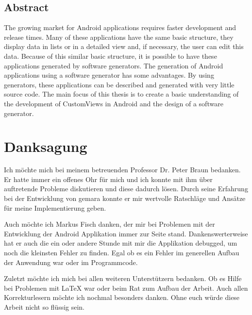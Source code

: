 \documentclass[12pt,oneside,a4paper,parskip]{scrbook}
\begin{document}
\section*{Abstract}
The growing market for Android applications requires faster development and release times. 
Many of these applications have the same basic structure, they display data in lists or in a detailed view and, if necessary, the user can edit this data. Because of this similar basic structure, it is possible to have these applications generated by software generators.
The generation of Android applications using a software generator has some advantages. By using generators, these applications can be described and generated with very little source code. The main focus of this thesis is to create a basic understanding of the development of CustomViews in Android and the design of a software generator.

\newpage
\chapter*{Danksagung}

Ich möchte mich bei meinem betreuenden Professor Dr. Peter Braun bedanken. Er hatte immer ein offenes Ohr für mich und ich konnte mit ihm über auftretende Probleme diskutieren und diese dadurch lösen. Durch seine Erfahrung bei der Entwicklung von \acf{gemara} konnte er mir wertvolle Ratschläge und Ansätze für meine Implementierung geben.

Auch möchte ich Markus Fisch danken, der mir bei Problemen mit der Entwicklung der Android Applikation immer zur Seite stand. Dankenswerterweise hat er auch die ein oder andere Stunde mit mir die Applikation debugged, um noch die kleinsten Fehler zu finden. Egal ob es ein Fehler im generellen Aufbau der Anwendung war oder im Programmcode.

Zuletzt möchte ich mich bei allen weiteren Unterstützern bedanken. Ob es Hilfe bei Problemen mit LaTeX war oder beim Rat zum Aufbau der Arbeit. Auch allen Korrekturlesern möchte ich nochmal besonders danken. Ohne euch würde diese Arbeit nicht so flüssig sein.

\tableofcontents										



\mainmatter




\end{document}

